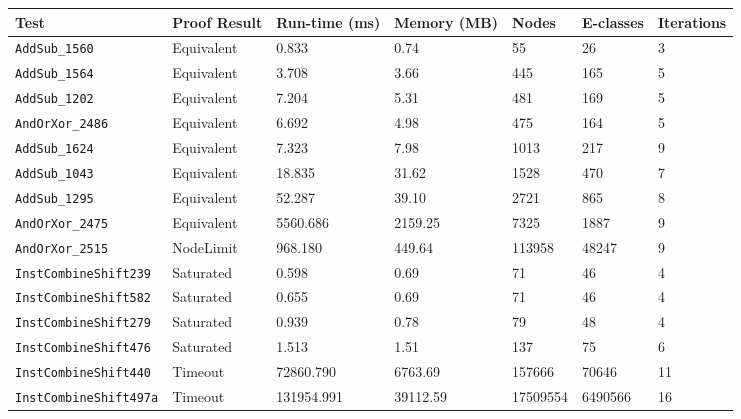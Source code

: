 \begin{tabular}{lllllll}
\toprule
\textbf{Test} & \textbf{Proof Result} & \textbf{Run-time (ms)} & \textbf{Memory (MB)} & \textbf{Nodes} & \textbf{E-classes} & \textbf{Iterations} \\
\midrule
\texttt{AddSub\_1560} & Equivalent & 0.833 & 0.74 & 55 & 26 & 3 \\
\texttt{AddSub\_1564} & Equivalent & 3.708 & 3.66 & 445 & 165 & 5 \\
\texttt{AddSub\_1202} & Equivalent & 7.204 & 5.31 & 481 & 169 & 5 \\
\texttt{AndOrXor\_2486} & Equivalent & 6.692 & 4.98 & 475 & 164 & 5 \\
\texttt{AddSub\_1624} & Equivalent & 7.323 & 7.98 & 1013 & 217 & 9 \\
\texttt{AddSub\_1043} & Equivalent & 18.835 & 31.62 & 1528 & 470 & 7 \\
\texttt{AddSub\_1295} & Equivalent & 52.287 & 39.10 & 2721 & 865 & 8 \\
\texttt{AndOrXor\_2475} & Equivalent & 5560.686 & 2159.25 & 7325 & 1887 & 9 \\
\texttt{AndOrXor\_2515} & NodeLimit & 968.180 & 449.64 & 113958 & 48247 & 9 \\
\texttt{InstCombineShift239} & Saturated & 0.598 & 0.69 & 71 & 46 & 4 \\
\texttt{InstCombineShift582} & Saturated & 0.655 & 0.69 & 71 & 46 & 4 \\
\texttt{InstCombineShift279} & Saturated & 0.939 & 0.78 & 79 & 48 & 4 \\
\texttt{InstCombineShift476} & Saturated & 1.513 & 1.51 & 137 & 75 & 6 \\
\texttt{InstCombineShift440} & Timeout & 72860.790 & 6763.69 & 157666 & 70646 & 11 \\
\texttt{InstCombineShift497a} & Timeout & 131954.991 & 39112.59 & 17509554 & 6490566 & 16 \\
\bottomrule
\end{tabular}
